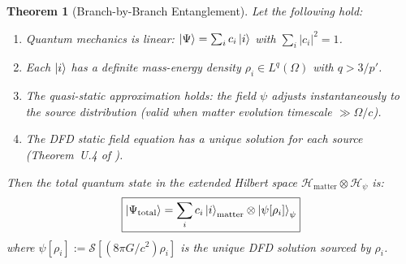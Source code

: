 \documentclass[aps,prd,twocolumn,superscriptaddress,nofootinbib]{revtex4-2}
\newtheorem{theorem}{Theorem}
\newcommand{\Hm}{\mathcal{H}_{\mathrm{matter}}}
\newcommand{\Hpsi}{\mathcal{H}_{\psi}}
\begin{document}
\begin{theorem}[Branch-by-Branch Entanglement]\label{thm:branch}
Let the following hold:
\begin{enumerate}
\item[\textbf{(QM)}] Quantum mechanics is linear: $\ket{\Psi} = \sum_i c_i \ket{i}$
with $\sum_i |c_i|^2 = 1$.
\item[\textbf{(Def)}] Each $\ket{i}$ has a definite mass-energy density
$\rho_i \in L^q(\Omega)$ with $q > 3/p'$.
\item[\textbf{(QS)}] The quasi-static approximation holds: the field $\psi$
adjusts instantaneously to the source distribution (valid when
matter evolution timescale $\gg \Omega/c$).
\item[\textbf{(Uniq)}] The DFD static field equation has a unique solution
for each source (Theorem~U.4 of \cite{DFDUnified}).
\end{enumerate}

Then the total quantum state in the extended Hilbert space
$\Hm \otimes \Hpsi$ is:
\begin{equation}\label{eq:branch-state}
\boxed{
\ket{\Psi_{\mathrm{total}}} = \sum_i c_i \ket{i}_{\mathrm{matter}}
\otimes \ket{\psi[\rho_i]}_\psi
}
\end{equation}
where $\psi[\rho_i] := \mathcal{S}[(8\pi G/c^2)\rho_i]$ is the unique
DFD solution sourced by $\rho_i$.
\end{theorem}
\end{document}
